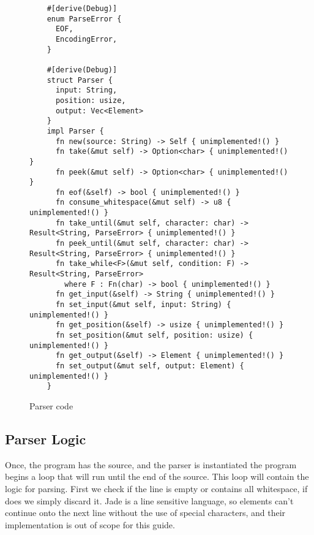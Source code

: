 \begin{figure}[ht!]
  \begin{verbatim}
    #[derive(Debug)]
    enum ParseError {
      EOF,
      EncodingError,
    }

    #[derive(Debug)]
    struct Parser {
      input: String,
      position: usize,
      output: Vec<Element>
    }
    impl Parser {
      fn new(source: String) -> Self { unimplemented!() }
      fn take(&mut self) -> Option<char> { unimplemented!() }
      fn peek(&mut self) -> Option<char> { unimplemented!() }
      fn eof(&self) -> bool { unimplemented!() }
      fn consume_whitespace(&mut self) -> u8 { unimplemented!() }
      fn take_until(&mut self, character: char) -> Result<String, ParseError> { unimplemented!() }
      fn peek_until(&mut self, character: char) -> Result<String, ParseError> { unimplemented!() }
      fn take_while<F>(&mut self, condition: F) -> Result<String, ParseError> 
        where F : Fn(char) -> bool { unimplemented!() }
      fn get_input(&self) -> String { unimplemented!() }
      fn set_input(&mut self, input: String) { unimplemented!() }
      fn get_position(&self) -> usize { unimplemented!() }
      fn set_position(&mut self, position: usize) { unimplemented!() }
      fn get_output(&self) -> Element { unimplemented!() }
      fn set_output(&mut self, output: Element) { unimplemented!() }
    }
  \end{verbatim}
  \caption{Parser code}
\end{figure}


\subsection{Parser Logic}
Once, the program has the source, and the parser is instantiated the program begins a loop that will run until the end of the source. This loop will contain the logic for parsing. First we check if the line is empty or contains all whitespace, if does we simply discard it. Jade is a line sensitive language, so elements can't continue onto the next line without the use of special characters, and their implementation is out of scope for this guide. 


